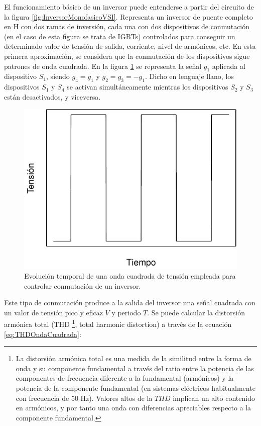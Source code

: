 El funcionamiento básico de un inversor puede entenderse a partir
del circuito de la figura \ref{fig:InversorMonofasicoVSI}. Representa
un inversor de puente completo en H con dos ramas de inversión, cada
una con dos dispositivos de conmutación (en el caso de esta figura
se trata de IGBTs) controlados para conseguir un determinado valor
de tensión de salida, corriente, nivel de armónicos, etc. En esta
primera aproximación, se considera que la conmutación de los dispositivos
sigue patrones de onda cuadrada. En la figura \ref{fig:Onda-cuadrada}
se representa la señal $g_{1}$ aplicada al dispositivo $S_{1}$,
siendo $g_{4}=g_{1}$ y $g_{2}=g_{3}=-g_{1}$. Dicho en lenguaje llano,
los dispositivos $S_{1}$ y $S_{4}$ se activan simultáneamente mientras
los dispositivos $S_{2}$ y $S_{3}$ están desactivados, y viceversa.

%
\begin{figure}
\includegraphics[scale=0.6]{../figs/Cuadrada}

\caption{Evolución temporal de una onda cuadrada de tensión empleada para controlar
conmutación de un inversor.\label{fig:Onda-cuadrada}}

\end{figure}


Este tipo de conmutación produce a la salida del inversor una señal
cuadrada con un valor de tensión pico y eficaz $V$ y periodo $T$.
Se puede calcular la distorsión armónica total (THD%
\footnote{La distorsión armónica total es una medida de la similitud entre la
forma de onda y su componente fundamental a través del ratio entre
la potencia de las componentes de frecuencia diferente a la fundamental
(armónicos) y la potencia de la componente fundamental (en sistemas
eléctricos habitualmente con frecuencia de 50 Hz). Valores altos de
la $THD$ implican un alto contenido en armónicos, y por tanto una
onda con diferencias apreciables respecto a la componente fundamental.%
}, total harmonic distortion) a través de la ecuación \ref{eq:THDOndaCuadrada}:

